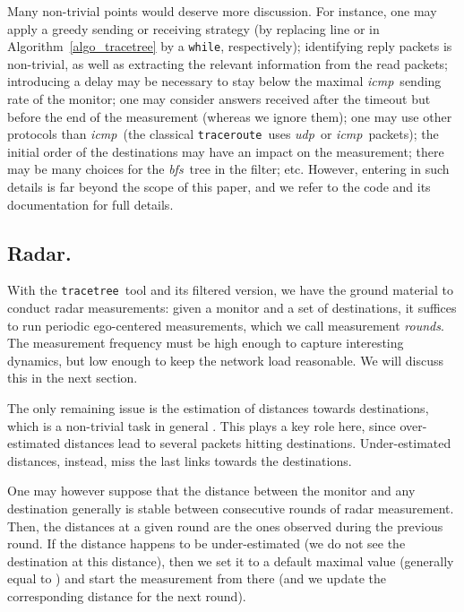 \documentclass[times, 10pt,twocolumn]{article}
\newcommand{\traceroute}{{\tt trace\-route}}
\newcommand{\tracetree}{{\tt trace\-tree}}
\newcommand{\icmp}{{\em \sc icmp}}
\newcommand{\udp}{{\em \sc udp}}
\newcommand{\bfs}{{\em \sc bfs}}
\begin{document}
Many non-trivial points would deserve more discussion. For instance,
one may apply a greedy sending or receiving strategy
(by replacing line  or  in
Algorithm~\ref{algo_tracetree} by a {\tt while}, respectively);
identifying reply packets is
non-trivial, as well as extracting the relevant information from the
read packets; introducing a delay may be necessary to stay below the maximal
\icmp\ sending rate of the monitor; one may consider answers received
after the timeout but before the end of the measurement (whereas we
ignore them); one may use other protocols than \icmp\ (the classical
\traceroute\ uses \udp\ or \icmp\ packets); the initial order of the
destinations may have an impact on the measurement; there may be many
choices for the \bfs\ tree in the filter; etc.  However, entering in
such details is far beyond the scope of this paper, and we refer to
the code and its documentation \cite{radarurl} for full details.


\subsection{Radar.}
\label{sec_radar}

With the \tracetree\ tool and its filtered version, we have the ground
material to conduct radar measurements: given a monitor and a set of
destinations, it suffices to run periodic ego-centered measurements,
which we call measurement {\em rounds}.
The measurement frequency must be high enough to capture interesting
dynamics, but low enough to keep the network load reasonable. We will
discuss this 
in the next section.

The only remaining issue is the estimation of distances towards destinations, which is a non-trivial task in general \cite{streamlining}. This plays a key role here, since over-estimated distances lead to several packets hitting destinations. Under-estimated distances, instead, miss the last links towards the destinations.

One may however suppose that the distance between the monitor and any
destination generally is stable between consecutive rounds of radar
measurement.
Then,
the distances at a given round are the ones observed during the
previous round. If the distance happens to be under-estimated (we do
not see the destination at this distance), then we set it to a default
maximal value (generally equal to ) and start the measurement from
there (and we update the corresponding distance for the next round).
\end{document}
